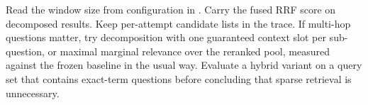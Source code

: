 \begin{recommended}
Read the window size from configuration in . Carry the fused RRF score on decomposed results. Keep per-attempt candidate lists in the trace. If multi-hop questions matter, try decomposition with one guaranteed context slot per sub-question, or maximal marginal relevance over the reranked pool, measured against the frozen baseline in the usual way. Evaluate a hybrid variant on a query set that contains exact-term questions before concluding that sparse retrieval is unnecessary.
\end{recommended}
